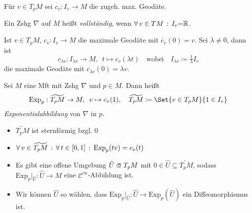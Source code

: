 \documentclass{cheat-sheet}
\newcommand{\Exp}{\mathrm{Exp}} %
\begin{document}
\begin{nota}
  Für $v \in T_p M$ sei $c_v : I_v \to M$ die zugeh. max. Geodäte.
\end{nota}

\begin{defn}
  Ein Zshg $\nabla$ auf $M$ heißt \emph{vollständig}, wenn $\forall \, {v \in TM} \,:\, I_v {=} \mathbb{R}$.
\end{defn}


\begin{lem}
  Ist $v \in T_p M$, $c_v : I_v \to M$ die maximale Geodäte mit $\dot{c_v}(0) = v$.
  Sei $\lambda \not= 0$, dann ist
  \[
    c_{\lambda v} : I_{\lambda v} \to M, \enspace
    t \mapsto c_v(\lambda t) \quad \text{wobei} \quad
    I_{\lambda v} \coloneqq \tfrac{1}{\lambda} I_v
  \]
  die maximale Geodäte mit $\dot{c_{\lambda v}}(0) = \lambda v$.
\end{lem}


\begin{defn}
  Sei $M$ eine Mft mit Zshg $\nabla$ und $p \in M$. Dann heißt
  \[
    \Exp_p : \widetilde{T_p M} \to M, \enspace
    v \mapsto c_v(1), \quad
    \widetilde{T_p M} \coloneqq \Set{ v \in T_p M }{ 1 \in I_v }
  \]
  \emph{Exponentialabbildung} von $\nabla$ in $p$.
\end{defn}

\begin{lem}
  \begin{itemize}
    \item $\widetilde{T_p M}$ ist sternförmig bzgl. $0$
    \item $\fa{v \in \widetilde{T_p M}} \fa{t \in \cinterval{0}{1}} \Exp_p(tv) = c_v(t)$
  \end{itemize}
\end{lem}

\begin{satz}
  \begin{itemize}
    \item Es gibt eine offene Umgebung $\hat{U} \opn T_p M$ mit $0 \in \hat{U} \subseteq \widetilde{T_p M}$, sodass $\Exp_p|_{\hat{U}} : \hat{U} \to M$ eine $\mathcal{C}^\infty$-Abbildung ist.
    \item Wir können $\hat{U}$ so wählen, dass $\Exp_p|_{\hat{U}} : \hat{U} \to \Exp_p(\hat{U})$ ein Diffeomorphismus ist.
  \end{itemize}
\end{satz}
\end{document}
